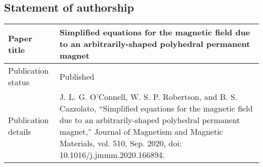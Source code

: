 \newpage
\subsection*{Statement of authorship}
\renewcommand{\arraystretch}{1.5}
\begin{tabular}{m{} m{}}
    \hline \hline Paper title & Simplified equations for the magnetic field due to an arbitrarily-shaped polyhedral permanent magnet \\ \hline
    Publication status & Published \\ \hline
    Publication details & J. L. G. O’Connell, W. S. P. Robertson, and B. S. Cazzolato, ``Simplified equations for the magnetic field due to an arbitrarily-shaped polyhedral permanent magnet,'' Journal of Magnetism and Magnetic Materials, vol. 510, Sep. 2020, doi: 10.1016/j.jmmm.2020.166894. \\ \hline \hline
\end{tabular}

\vfill

